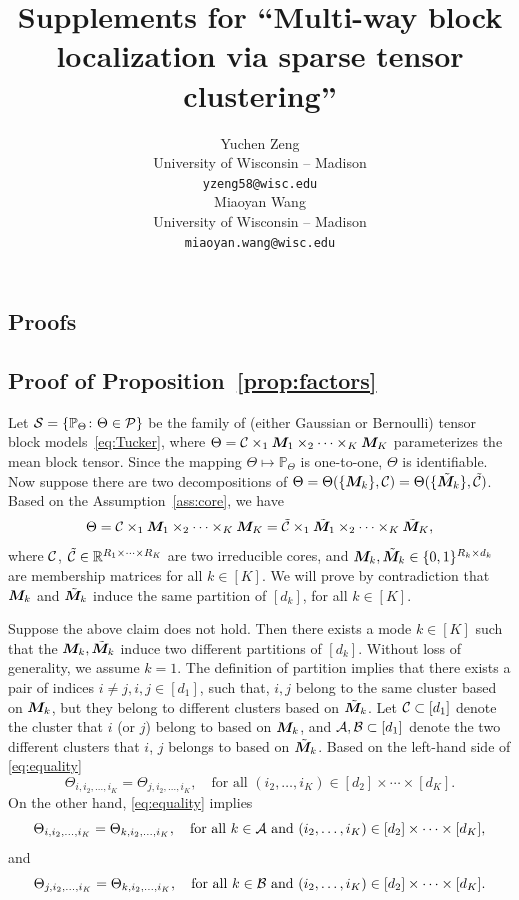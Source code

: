 \documentclass{article}
\title{Supplements for ``Multi-way block localization via sparse tensor clustering''}
\author{%
Yuchen Zeng \\
University of Wisconsin -- Madison\\
 \texttt{yzeng58@wisc.edu} \\
\And
Miaoyan Wang \\
University of Wisconsin -- Madison\\
\texttt{miaoyan.wang@wisc.edu} \\
}
\begin{document}
\maketitle


\begin{appendices}
\section{Proofs}
	
\subsection{Proof of Proposition~\ref{prop:factors}}
Let $\mathcal{S}=\{\mathbb{P}_{\Theta}\colon \Theta\in\mathcal{P}\}$ be the family of (either Gaussian or Bernoulli) tensor block models~\eqref{eq:Tucker}, where $\Theta=\mathcal{C} \times_1\bm M_1\times_2\cdots\times_K\bm M_K$ parameterizes the mean block tensor. Since the mapping $\Theta\mapsto\mathbb{P}_{\Theta}$ is one-to-one, $\Theta$ is identifiable. Now suppose there are two decompositions of $\Theta=\Theta(\{\bm M_k\}, \mathcal{C})=\Theta(\{\tilde {\bm M}_k\}, \tilde {\mathcal{C}})$. Based on the Assumption~\ref{ass:core}, we have
\begin{equation}\label{eq:equality}
\Theta=\mathcal{C} \times_1\bm M_1\times_2\cdots\times_K\bm M_K=\tilde {\mathcal{C}} \times_1\tilde {\bm M}_1\times_2\cdots\times_K\tilde  {\bm M}_K,
\end{equation}
where $\mathcal{C}$, $\tilde {\mathcal{C}}\in\mathbb{R}^{R_1\times \cdots \times R_K}$ are two irreducible cores, and $\bm M_k,\tilde {\bm M}_k\in\{0,1\}^{R_k\times d_k}$ are membership matrices for all $k\in[K]$. We will prove by contradiction that $\bm M_k$ and $\tilde {\bm M}_k$ induce the same partition of $[d_k]$, for all $k\in[K]$. 

Suppose the above claim does not hold. Then there exists a mode $k\in[K]$ such that the $\bm M_k, \tilde {\bm M}_k$ induce two different partitions of $[d_k]$. Without loss of generality, we assume $k=1$. The definition of partition implies that there exists a pair of indices $i\neq j, i,j\in[d_1]$, such that, $i,j$ belong to the same cluster based on $\bm M_k$, but they belong to different clusters based on $\tilde {\bm M}_k$. Let $\mathcal{C}\subset [d_1] $ denote the cluster that $i$ (or $j$) belong to based on $\bm M_k$, and $\mathcal{A}, \mathcal{B}\subset[d_1]$ denote the two different clusters that $i$, $j$ belongs to based on $\tilde {\bm M}_k$. Based on the left-hand side of \eqref{eq:equality}
\begin{equation}\label{eq:cluster1}
\Theta_{i,i_2,\ldots,i_K}=\Theta_{j,i_2,\ldots,i_K},\quad \text{for all } (i_2,\ldots,i_K)\in[d_2]\times\cdots\times [d_K].
\end{equation}
 On the other hand, \eqref{eq:equality} implies
\begin{equation}\label{eq:cluster2}
\Theta_{i,i_2,\ldots,i_K}=\Theta_{k,i_2,\ldots,i_K},\quad \text{for all } k\in \mathcal{A} \text{ and }(i_2,\ldots,i_K)\in[d_2]\times\cdots\times [d_K],
\end{equation}
and
\begin{equation}\label{eq:cluster3}
\Theta_{j,i_2,\ldots,i_K}=\Theta_{k,i_2,\ldots,i_K},\quad \text{for all } k\in \mathcal{B} \text{ and }(i_2,\ldots,i_K)\in[d_2]\times\cdots\times [d_K].
\end{equation}


\end{appendices}
\end{document}
